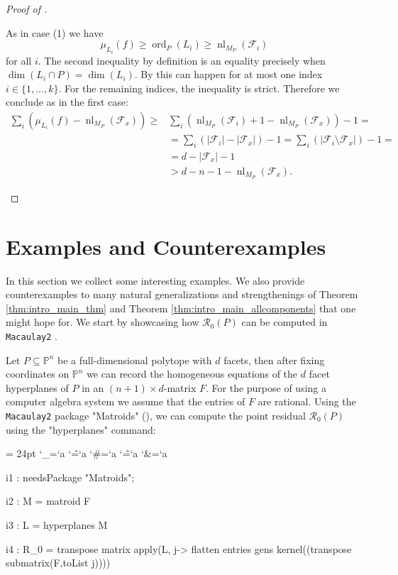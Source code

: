 \documentclass[a4paper,10pt]{amsart}
\def\beginOutput{%
    \par
    \penalty -150
    \penalty -150
    \begingroup
      \def\\{%
          \leavevmode
          \hss
          \endgraf
          \penalty 150
          }
      \ttten
      \parindent = 24pt
      \def\${\char`\$}
      \def\{{\char`\{}
      \def\}{\char`\}}
      \catcode`\_=\the\catcode`a
      \catcode`\^=\the\catcode`a
      \catcode`\#=\the\catcode`a
      \catcode`\~=\the\catcode`a
      \catcode`\&=\the\catcode`a
      \parskip=0pt
      \lineskip=0pt
      \obeyspaces
      }
\def\endOutput{%
    \endgroup
    \par
    \penalty -150
    \penalty -150
    \noindent}
\theoremstyle{definition}
\theoremstyle{plain}
\newcommand{\ord}{\operatorname{ord}}
\newcommand{\nl}{\operatorname{nl}}
\newcommand{\cF}{{\mathcal F}}
\newcommand{\cR}{{\mathcal R}}
\newcommand{\pp}{\mathbb{P}}
\begin{document}
\begin{proof}[Proof of ]
\begin{enumerate}
    As in case (1) we have
    \begin{equation*}
        \mu_{L_i}(f) \geq \ord_P(L_i) \geq \nl_{M_P}(\cF_i) 
    \end{equation*}
    for all $i$. The second inequality by definition is an equality precisely when $\dim(L_i\cap P)=\dim(L_i)$. By  this can happen for at most one index $i\in \{1,\ldots,k\}$.  For the remaining indices, the inequality is strict. Therefore we conclude as in the first case:
    \begin{equation*}
    \begin{split}
        \sum_i \left( \mu_{L_i}(f) - \nl_{M_P}(\cF_x) \right) \geq &\sum_i \left( \nl_{M_P}(\cF_i) + 1 - \nl_{M_P}(\cF_x) \right) - 1 = \\
        &= \sum_i \left(|\cF_i| - |\cF_x|\right) - 1 = \sum_i \left( |\cF_i \setminus \cF_x| \right) - 1 = \\
        &= d - |\cF_x| - 1 \\&> d - n - 1 - \nl_{M_P}(\cF_x).
    \end{split} 
    \end{equation*}
\end{enumerate}
\end{proof}

\section{Examples and Counterexamples} \label{sec: exmpls}
In this section we collect some interesting examples. We also provide counterexamples to many natural generalizations and strengthenings of Theorem \ref{thm:intro_main_thm} and Theorem \ref{thm:intro_main_allcomponents} that one might hope for. We start by showcasing how $\cR_0(P)$ can be computed in {\tt Macaulay2} \cite{M2}.

Let $P\subseteq \pp^n$ be a full-dimensional polytope with $d$ facets, then after fixing coordinates on $\pp^n$ we can record the homogeneous equations of the $d$ facet hyperplanes of $P$ in an $(n+1)\times d$-matrix $F$. For the purpose of using a computer algebra system we assume that the entries of $F$ are rational.
Using the {\tt Macaulay2} \cite{M2} package "Matroids" (\cite{M2PackageMatroids, MatroidsSource}),  we can compute the point residual $\cR_0(P)$ using the "hyperplanes" command:

\beginOutput
i1 : needsPackage "Matroids";\\
i2 : M = matroid F\\
i3 : L = hyperplanes M\\
i4 : R\_0 = transpose matrix apply(L, j-> flatten entries gens \\ \hspace{1cm} kernel((transpose submatrix(F,toList j))))  
\endOutput
\end{document}
